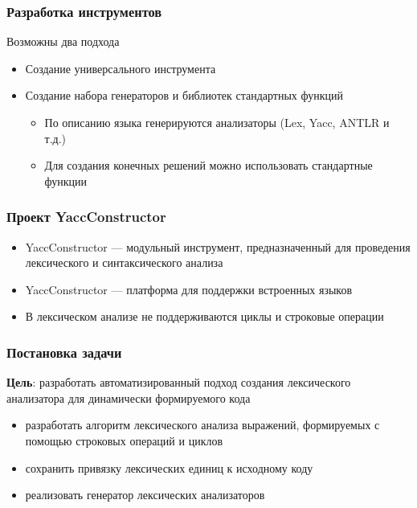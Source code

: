 \documentclass{beamer}
\begin{document}
\begin{frame}
    \transwipe[direction=90]
    \frametitle{Разработка инструментов}
    Возможны два подхода  
    \begin{itemize}
      \item Создание универсального инструмента
      \item Создание набора генераторов и библиотек стандартных функций
      \begin{itemize}
        \item По описанию языка генерируются анализаторы (Lex, Yacc, ANTLR и т.д.) 
        \item Для создания конечных решений можно использовать стандартные функции
      \end{itemize}
    \end{itemize}
\end{frame}

\begin{frame}
\transwipe[direction=90]
\frametitle{Проект YaccConstructor}
\begin{itemize}
\item YaccConstructor --- модульный инструмент, предназначенный для проведения лексического и синтаксического анализа  
\item YaccConstructor --- платформа для поддержки встроенных языков
\newline
\item В лексическом анализе не поддерживаются циклы и строковые операции
\end{itemize}
\end{frame}


\begin{frame}
\transwipe[direction=90]
\frametitle{Постановка задачи}
\textbf{Цель}: разработать автоматизированный подход создания лексического анализатора для динамически формируемого кода

\begin{itemize}
\item разработать алгоритм лексического анализа выражений, формируемых с помощью строковых операций и циклов
\item сохранить привязку лексических единиц к исходному коду
\item реализовать генератор лексических анализаторов
\end{itemize}
\end{frame}
\end{document}
